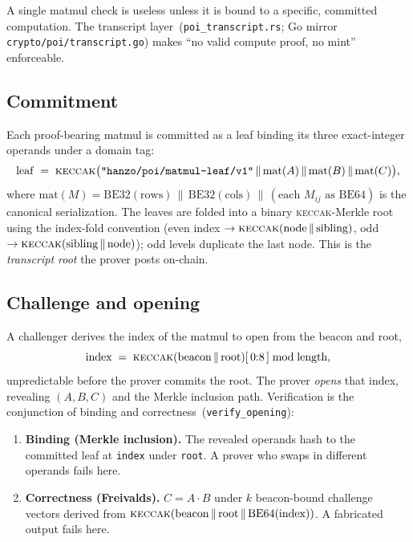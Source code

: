\documentclass[11pt,a4paper]{article}
\begin{document}
A single matmul check is useless unless it is bound to a specific, committed computation. The transcript layer~(\texttt{poi\_transcript.rs}; Go mirror \texttt{crypto/poi/transcript.go}) makes ``no valid compute proof, no mint'' enforceable.

\subsection{Commitment}

Each proof-bearing matmul is committed as a leaf binding its three exact-integer operands under a domain tag:
\[
  \mathrm{leaf} \;=\; \textsc{keccak}\big(\texttt{"hanzo/poi/matmul-leaf/v1"} \,\|\, \mathrm{mat}(A) \,\|\, \mathrm{mat}(B) \,\|\, \mathrm{mat}(C)\big),
\]
where $\mathrm{mat}(M) = \mathrm{BE32}(\text{rows}) \,\|\, \mathrm{BE32}(\text{cols}) \,\|\, (\text{each } M_{ij} \text{ as } \mathrm{BE64})$ is the canonical serialization. The leaves are folded into a binary \textsc{keccak}-Merkle root using the index-fold convention (even index $\to \textsc{keccak}(\text{node}\,\|\,\text{sibling})$, odd $\to \textsc{keccak}(\text{sibling}\,\|\,\text{node})$); odd levels duplicate the last node. This is the \emph{transcript root} the prover posts on-chain.

\subsection{Challenge and opening}

A challenger derives the index of the matmul to open from the beacon and root,
\[
  \text{index} \;=\; \textsc{keccak}(\text{beacon} \,\|\, \text{root})[\,0{:}8\,] \bmod \text{length},
\]
unpredictable before the prover commits the root. The prover \emph{opens} that index, revealing $(A,B,C)$ and the Merkle inclusion path. Verification is the conjunction of binding and correctness~(\texttt{verify\_opening}):
\begin{enumerate}
  \item \textbf{Binding (Merkle inclusion).} The revealed operands hash to the committed leaf at \texttt{index} under \texttt{root}. A prover who swaps in different operands fails here.
  \item \textbf{Correctness (Freivalds).} $C = A\cdot B$ under $k$ beacon-bound challenge vectors derived from $\textsc{keccak}(\text{beacon}\,\|\,\text{root}\,\|\,\mathrm{BE64}(\text{index}))$. A fabricated output fails here.
\end{enumerate}
\end{document}
